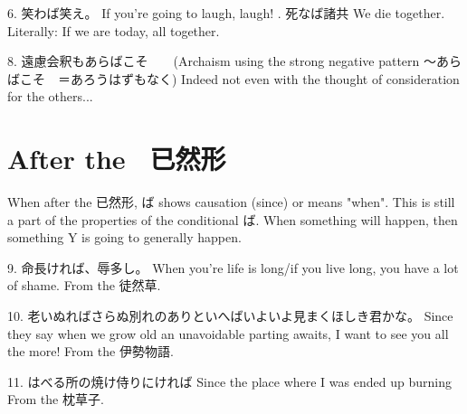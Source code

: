 \par{6. 笑わば笑え。 \hfill\break
If you're going to laugh, laugh! \hfill\break
\hfill{}. 死なば諸共 \hfill\break
We die together. \hfill\break
Literally: If we are today, all together. }

\par{8. 遠慮会釈もあらばこそ　　(Archaism using the strong negative pattern ～あらばこそ　＝あろうはずもなく) \hfill\break
Indeed not even with the thought of consideration for the others\dothyp{}\dothyp{}\dothyp{} }
      
\section{After the  已然形}
 
\par{ When after the 已然形, ば shows causation (since) or means "when". This is still a part of the properties of the conditional ば. When something will happen, then something Y is going to generally happen. }

\par{9. 命長ければ、辱多し。 \hfill\break
When you're life is long\slash if you live long, you have a lot of shame. \hfill\break
From the 徒然草. }

\par{10. 老いぬればさらぬ別れのありといへばいよいよ見まくほしき君かな。 \hfill\break
Since they say when we grow old an unavoidable parting awaits, I want to see you all the more! \hfill\break
From the 伊勢物語. }

\par{11. はべる所の焼け侍りにければ \hfill\break
Since the place where I was ended up burning \hfill\break
From the 枕草子. }
    